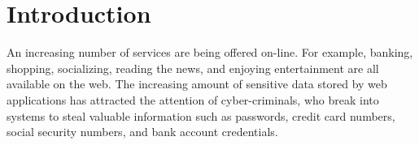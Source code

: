 





\section{Introduction}
An increasing number of services are being offered on-line. For
example, banking, shopping, socializing, reading the news, and
enjoying entertainment are all available on the web. The increasing amount
of sensitive data stored by web applications has
attracted the attention of cyber-criminals, who break into systems to
steal valuable information such as passwords, credit card numbers,
social security numbers, and bank account credentials.

